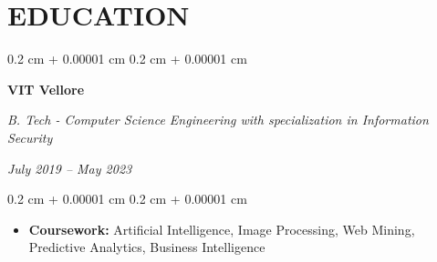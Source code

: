 \documentclass[10pt, letterpaper]{article}
\newenvironment{highlights}{
    \begin{itemize}[
        topsep=0.10 cm,
        parsep=0.10 cm,
        partopsep=0pt,
        itemsep=0pt,
        leftmargin=0.4 cm + 10pt
    ]
}{
    \end{itemize}
} %
\newenvironment{highlightsforbulletentries}{
    \begin{itemize}[
        topsep=0.10 cm,
        parsep=0.10 cm,
        partopsep=0pt,
        itemsep=0pt,
        leftmargin=10pt
    ]
}{
    \end{itemize}
} %
\newenvironment{onecolentry}{
    \begin{adjustwidth}{
        0.2 cm + 0.00001 cm
    }{
        0.2 cm + 0.00001 cm
    }
}{
    \end{adjustwidth}
} %
\newenvironment{twocolentry}[2][]{
    \onecolentry
    \def\secondColumn{#2}
    \setcolumnwidth{\fill, 4.5 cm}
    \begin{paracol}{2}
}{
    \switchcolumn \raggedleft \secondColumn
    \end{paracol}
    \endonecolentry
} %
\let\hrefWithoutArrow\href
\renewcommand{\href}[2]{\hrefWithoutArrow{#1}{\ifthenelse{\equal{#2}{}}{ }{#2 }\raisebox{.15ex}{\footnotesize \faExternalLink*}}}
\begin{document}
    \vspace{0.2 cm}
    
    




    \section{EDUCATION}
        
        \begin{twocolentry}{
        
        \textit{July 2019 – May 2023}}
            \textbf{VIT Vellore}

            \textit{B. Tech - Computer Science Engineering with specialization in Information Security}
        \end{twocolentry}

        \vspace{0.10 cm}
        \begin{onecolentry}
            \begin{highlights}
                \item \textbf{Coursework:} Artificial Intelligence, Image Processing, Web Mining, Predictive Analytics, Business Intelligence
            \end{highlights}
        \end{onecolentry}
    \vspace{0.2 cm}
\end{document}
